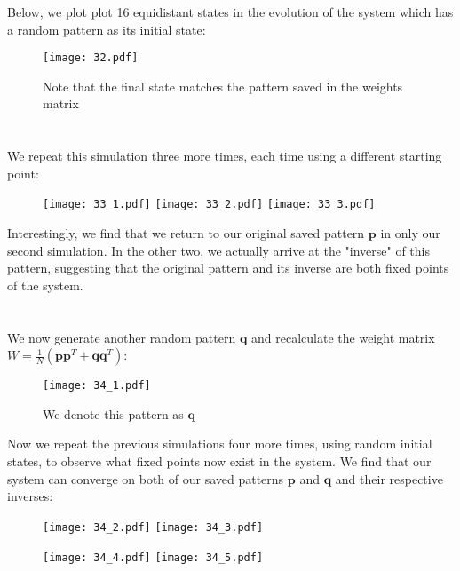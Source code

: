 \documentclass{article}
\begin{document}
Below, we plot plot 16 equidistant states in the evolution of the system which has a random pattern as its initial state:

\begin{figure}[ht]
    \centering
    \texttt{[image: 32.pdf]}
    \caption{Note that the final state matches the pattern saved in the weights matrix}
\end{figure}



\section{}
We repeat this simulation three more times, each time using a different starting point:

\begin{figure}[ht]
    \centering
    \texttt{[image: 33\_1.pdf]}
    \texttt{[image: 33\_2.pdf]}
    \texttt{[image: 33\_3.pdf]}
\end{figure}

Interestingly, we find that we return to our original saved pattern $\boldsymbol{p}$ in only our second simulation. In the other two, we actually arrive at the "inverse" of this pattern, suggesting that the original pattern and its inverse are both fixed points of the system.
\vspace{1em}



\section{}
We now generate another random pattern $\boldsymbol{q}$ and recalculate the weight matrix $W = \frac{1}{N} (\boldsymbol{p} \boldsymbol{p}^T + \boldsymbol{q} \boldsymbol{q}^T)$: 

\begin{figure}[ht]
    \centering
    \texttt{[image: 34\_1.pdf]}
    \caption{We denote this pattern as $\boldsymbol{q}$}
\end{figure}

Now we repeat the previous simulations four more times, using random initial states, to observe what fixed points now exist in the system. We find that our system can converge on both of our saved patterns $\boldsymbol{p}$ and $\boldsymbol{q}$ and their respective inverses:


\begin{figure}[ht]
    \centering
    \begin{minipage}{0.48\textwidth}
        \centering
        \texttt{[image: 34\_2.pdf]}
        \texttt{[image: 34\_3.pdf]}
    \end{minipage}\hfill
    \begin{minipage}{0.48\textwidth}
        \centering
        \texttt{[image: 34\_4.pdf]}
        \texttt{[image: 34\_5.pdf]}
    \end{minipage}
\end{figure}
\end{document}
